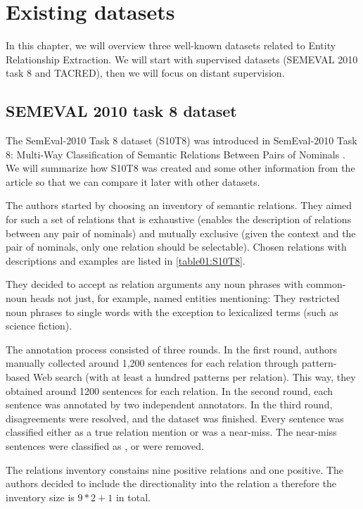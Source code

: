 \chapter{Existing datasets}
\label{chap:datasets}

In this chapter, we will overview three well-known datasets related to Entity Relationship Extraction. We will start with supervised datasets (SEMEVAL 2010 task 8 and TACRED), then we will focus on distant supervision.


\section{SEMEVAL 2010 task 8 dataset}
The SemEval-2010 Task 8 dataset (S10T8) was introduced in SemEval-2010 Task 8: Multi-Way Classification of Semantic Relations Between Pairs of Nominals \cite{semeval}. We will summarize how S10T8 was created and some other information from the article so that we can compare it later with other datasets.

The authors started by choosing an inventory of semantic relations. They aimed for such a set of relations that is exhaustive (enables the description of relations between any pair of nominals) and mutually exclusive (given the context and the pair of nominals, only one relation should be selectable).  Chosen relations with descriptions and examples are listed in \autoref{table01:S10T8}. 


They decided to accept as relation arguments any noun phrases with common-noun heads not just, for example, named entities mentioning:  They restricted noun phrases to single words with the exception to lexicalized terms (such as science fiction).

The annotation process consisted of three rounds. In the first round, authors manually collected around 1,200 sentences for each relation through pattern-based Web search (with at least a hundred patterns per relation). This way, they obtained around 1200 sentences for each relation. In the second round, each sentence was annotated by two independent annotators. In the third round, disagreements were resolved, and the dataset was finished. Every sentence was classified either as a true relation mention or was a near-miss. The near-miss sentences were classified as , or were removed.

The relations inventory constains nine positive relations and one positive. The authors decided to include the directionality into the relation a therefore the inventory size is $9*2 + 1$ in total. 

